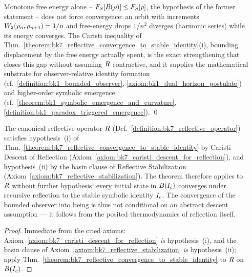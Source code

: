 \begin{demonstratio}
\label{demonstratio:bk7_convergence_within_reflective_basin}
Monotone free energy alone -- $F_S[R(\rho)] \le F_S[\rho]$, the hypothesis of the former statement -- does not force convergence: an orbit with increments $W_2(\rho_n,\rho_{n+1}) = 1/n$ and free-energy drops $1/n^2$ diverges (harmonic series) while its energy converges. The Caristi inequality of Thm.~\ref{theorem:bk7_reflective_convergence_to_stable_identity}(i), bounding displacement by the free energy actually spent, is the exact strengthening that closes this gap without assuming $R$ contractive, and it supplies the mathematical substrate for observer-relative identity formation (cf.~\ref{definition:bk1_bounded_observer}, \ref{axiom:bk1_dual_horizon_postulate}) and higher-order symbolic emergence (cf.~\ref{theorem:bk1_symbolic_emergence_and_curvature}, \ref{definition:bk1_paradox_triggered_emergence}). \qed
\end{demonstratio}

\begin{corollary}
\label{corollary:bk7_observer_converges}
The canonical reflective operator \(R\) (Def.~\ref{definition:bk7_reflective_operator}) satisfies hypothesis~(i) of Thm.~\ref{theorem:bk7_reflective_convergence_to_stable_identity} by Caristi Descent of Reflection (Axiom~\ref{axiom:bk7_caristi_descent_for_reflection}), and hypothesis~(ii) by the basin clause of Reflective Stabilization (Axiom~\ref{axiom:bk7_reflective_stabilization}). The theorem therefore applies to \(R\) without further hypothesis: every initial state in \(B(I_c)\) converges under recursive reflection to the stable symbolic identity \(I_c\). The convergence of the bounded observer into being is thus not conditional on an abstract descent assumption --- it follows from the posited thermodynamics of reflection itself.
\end{corollary}
\begin{proof}
\label{proof:bk7_observer_converges}
Immediate from the cited axioms: Axiom~\ref{axiom:bk7_caristi_descent_for_reflection} \emph{is} hypothesis~(i), and the basin clause of Axiom~\ref{axiom:bk7_reflective_stabilization} \emph{is} hypothesis~(ii); apply Thm.~\ref{theorem:bk7_reflective_convergence_to_stable_identity} to \(R\) on \(B(I_c)\).
\end{proof}

